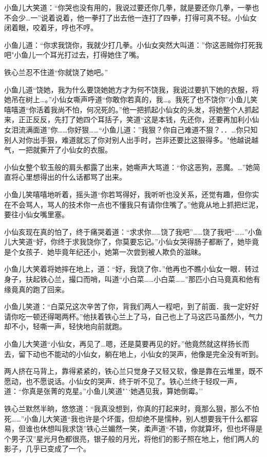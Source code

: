 \documentclass[12pt,oneside]{book}
\begin{document}
小鱼儿大笑道：``你哭也没有用的，我说过要还你几拳，就是要还你几拳，一拳也不会少\ldots 一''说着说着，他一拳打了出去他一连打了四拳，打得可真不轻。小仙女闭着眼，咬着牙，哼也不哼。

小鱼儿道：``你求我饶你，我就少打几拳。小仙女突然大叫道：''你这恶贼你打死我吧"小鱼儿一个耳光打过去，打得她住了嘴。

铁心兰忍不住道``你就饶了她吧。''

小鱼儿道``饶她，我为什么要饶她她方才为何不饶我，我说过要扒下她的衣服，将她吊在树上\ldots。''小仙女嘶声呼道``你敢你若真的，我\ldots。我死了也不饶你''小鱼儿笑嘻嘻道``你活着我尚不怕，何况死的。''他一把抓起小仙女的头发，将她整个人抓起来，正正反反，先打了她四个耳括子，笑道``这是本钱，先还你，还要再加利小仙女泪流满面道''你\ldots\ldots 你好狠\ldots\ldots{}``小鱼儿道：''我狠？你自己难道不狠？．．\ldots 你只知别人对你出手狠，难道就忘了你对别人出手时，岂非还要比这狠得多。"他越说越气，一把就撕开了小仙女的衣服。

小仙女整个软玉般的肩头都露了出来，她嘶声大骂道：``你这恶狗，恶魔。\ldots{}''她简直将心里想得出的什么话都骂了出来。

小鱼儿笑嘻嘻地听着，摇头道``你若骂得好，我听听也没关系，还觉有趣，但你实在不会骂人，骂人的技术你一点也不懂我只有请你住嘴了。''他竟从地上抓把烂泥，要往小仙女嘴里塞。

小仙亥现在真的怕了，终于痛哭着道：``求求你\ldots\ldots 饶了我吧''\ldots\ldots 饶了我吧``\ldots\ldots{}''小鱼儿大笑道``好，你终于求我饶你了，你莫要忘记。''小仙女哭得肠子都断了，她毕竟是个女孩子．她毕竟年纪还小，她第一次尝到被人欺负的滋昧。

小鱼儿大笑着将她摔在地上，道：``好，我饶了你．''他再也不瞧小仙女一眼．转过身子，扶起铁心兰，撮口而哨，叫道``小白菜\ldots\ldots 小白菜\ldots\ldots{}''那匹小白马竟真和他有缘竟真的跑了回来。

小鱼儿笑道：``白菜兄这次辛苦了你，背我们两人一程吧，到了前面．我一定好好请你吃一顿还得喝两杯。''他扶着铁心兰上了马，自己也上了马这匹马虽然小，气力却不小，轻嘶一声，轻快地向前就跑。

小鱼儿大笑道``小仙女，再见了\ldots 嗯，还是莫要再见的好。''他竟然就这样扬长而去，留下动也不能动的小仙女，躺在地上，小仙女的哭声，他像是完全没有听到。

两人挤在马背上，靠得紧紧的，铁心兰只觉身子又轻又软，像是靠在云堆里，既不愿动，也不愿说话。小仙女的哭声．终于听不见了。铁心兰终于轻叹一声，道：``你真是张菁的克星。''小鱼儿笑道"``她遇见我，算她倒霉。''

铁心兰默然半晌，悠悠道：``我真没想到，你真的打起来时，竟那么狠，那么不怕死\ldots\ldots{}''小鱼儿大笑道``我也许是个坏蛋，但却绝不是懦种，别人想要我干什么都容易，但谁也休想叫我求饶''铁心兰媚然一笑，柔声道``不错，你就算坏，但也坏得是个男子汉''星光月色都很亮，银子般的月光，将他们的影子照在地上，他们两人的影子，几乎已变成了一个。
\end{document}
